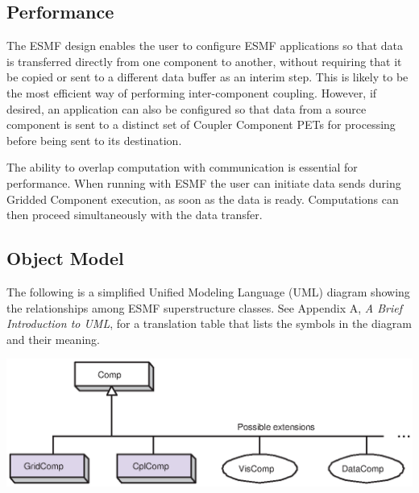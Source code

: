 \subsection{Performance}
\label{sec:performance}

The ESMF design enables the user to configure ESMF
applications so that data is transferred directly from one component 
to another, without requiring that it be copied or sent to a different data
buffer as an interim step.  This is likely to be the most efficient way 
of performing inter-component coupling.  However, if desired, an 
application can also be configured so that data from a source component 
is sent to a distinct set of Coupler Component PETs for processing 
before being sent to its destination.

The ability to overlap computation with communication is essential for
performance.  When running with ESMF the user can initiate data 
sends during Gridded Component execution, as soon as the data is ready.
Computations can then proceed simultaneously with the data transfer.

\newpage
\subsection{Object Model}

The following is a simplified Unified Modeling Language (UML) diagram showing the relationships among
ESMF superstructure classes.  See Appendix A, {\it A Brief Introduction 
to UML}, for a translation table that lists the symbols in the diagram 
and their meaning.

\begin{center}
\includegraphics{Comp_obj}   
\end{center}



